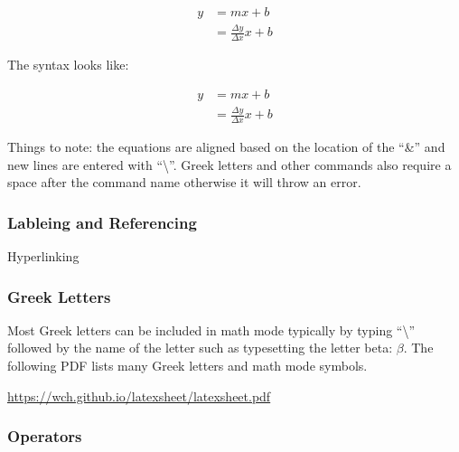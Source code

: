 \begin{align}
y &= mx + b\\ 
  &= \frac{\Delta y}{\Delta x}x + b
\end{align}

The syntax looks like:

\begin{center}
\begin{latexcode}
\begin{align}
y &= mx + b\\ 
  &= \frac{\Delta y}{\Delta x}x + b
\end{align}
\end{latexcode}
\end{center}

Things to note: the equations are aligned based on the location of the ``\&'' and new lines are entered with ``\textbackslash''. Greek letters and other commands also require a space after the command name otherwise it will throw an error.

\subsubsection{Lableing and Referencing}

Hyperlinking

\subsubsection{Greek Letters}
Most Greek letters can be included in math mode typically by typing ``\textbackslash'' followed by the name of the letter such as typesetting the letter beta: $\beta$. The following PDF lists many Greek letters and math mode symbols.

\begin{center}
	\url{https://wch.github.io/latexsheet/latexsheet.pdf}
\end{center}



\subsubsection{Operators}















